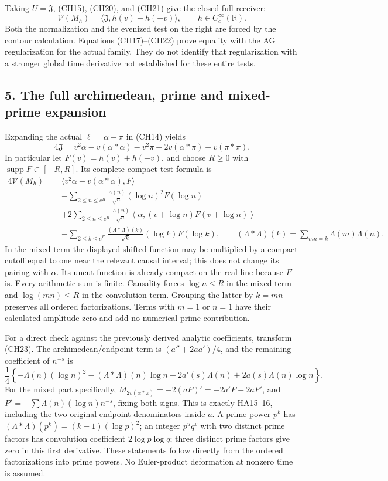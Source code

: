 \documentclass[
  10pt,
  a4paper,
]{article}
\begin{document}
Taking \(U=\mathfrak J\), (CH15), (CH20), and (CH21) give the closed
full receiver: \[
\boxed{\mathcal V(M_h)=\langle\mathfrak J,h(v)+h(-v)\rangle,
\qquad h\in C_c^\infty(\mathbb R).}
\tag{CH22}
\] Both the normalization and the evenized test on the right are forced
by the contour calculation. Equations (CH17)--(CH22) prove equality with
the AG regularization for the actual family. They do not identify that
regularization with a stronger global time derivative not established
for these entire tests.

\subsection{5. The full archimedean, prime and mixed-prime
expansion}\label{the-full-archimedean-prime-and-mixed-prime-expansion}

Expanding the actual \(\ell=\alpha-\pi\) in (CH14) yields \[
4\mathfrak J=
v^2\alpha-v(\alpha*\alpha)-v^2\pi
+2v(\alpha*\pi)-v(\pi*\pi).
\tag{CH23}
\] In particular let \(F(v)=h(v)+h(-v)\), and choose \(R\ge0\) with
\(\operatorname{supp}F\subset[-R,R]\). Its complete compact test formula
is \[
\begin{aligned}
4\mathcal V(M_h)={}&
\langle v^2\alpha-v(\alpha*\alpha),F\rangle\\
&-\sum_{2\le n\le e^R}\frac{\Lambda(n)}{\sqrt n}(\log n)^2F(\log n)\\
&+2\sum_{2\le n\le e^R}\frac{\Lambda(n)}{\sqrt n}
\left\langle\alpha,(v+\log n)F(v+\log n)\right\rangle\\
&-\sum_{2\le k\le e^R}\frac{(\Lambda*\Lambda)(k)}{\sqrt k}
(\log k)F(\log k),
\qquad
(\Lambda*\Lambda)(k)=\sum_{mn=k}\Lambda(m)\Lambda(n).
\end{aligned}
\tag{CH24}
\] In the mixed term the displayed shifted function may be multiplied by
a compact cutoff equal to one near the relevant causal interval; this
does not change its pairing with \(\alpha\). Its uncut function is
already compact on the real line because \(F\) is. Every arithmetic sum
is finite. Causality forces \(\log n\le R\) in the mixed term and
\(\log(mn)\le R\) in the convolution term. Grouping the latter by
\(k=mn\) preserves all ordered factorizations. Terms with \(m=1\) or
\(n=1\) have their calculated amplitude zero and add no numerical prime
contribution.

For a direct check against the previously derived analytic coefficients,
transform (CH23). The archimedean/endpoint term is \((a''+2aa')/4\), and
the remaining coefficient of \(n^{-s}\) is \[
\frac14\left\{
-\Lambda(n)(\log n)^2-(\Lambda*\Lambda)(n)\log n
-2a'(s)\Lambda(n)+2a(s)\Lambda(n)\log n
\right\}.
\tag{CH25}
\] For the mixed part specifically,
\(M_{2v(\alpha*\pi)}=-2(aP)'=-2a'P-2aP'\), and
\(P'=-\sum\Lambda(n)(\log n)n^{-s}\), fixing both signs. This is exactly
HA15--16, including the two original endpoint denominators inside \(a\).
A prime power \(p^k\) has \((\Lambda*\Lambda)(p^k)=(k-1)(\log p)^2\); an
integer \(p^u q^v\) with two distinct prime factors has convolution
coefficient \(2\log p\log q\); three distinct prime factors give zero in
this first derivative. These statements follow directly from the ordered
factorizations into prime powers. No Euler-product deformation at
nonzero time is assumed.
\end{document}
